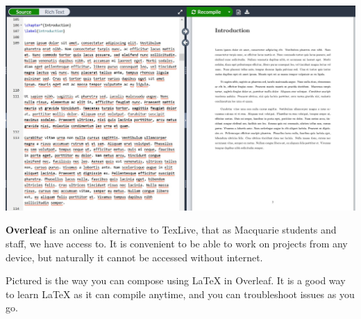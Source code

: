 \documentclass[unknownkeysallowed,usepdftitle=false, aspectratio=169,parskip=full]{beamer}
\newcommand{\secvariable}{nothing}
\newcommand{\mysection}[1]{\renewcommand{\secvariable}{#1}
}
\begin{document}
\mysection{major}
\begin{frame}\label{\secvariable} %
\begin{center}
\includegraphics[width=1\textwidth,height=0.6\textheight,keepaspectratio]{Images/OverleafText.JPG}
\end{center}

    \parbox{\linewidth}{
\textbf{Overleaf} is an online alternative to TexLive, that as Macquarie students and staff, we have access to. 
It is convenient to be able to work on projects from any device, but naturally it cannot be accessed without internet.

Pictured is the way you can compose using LaTeX in Overleaf. It is a good way to learn LaTeX as it can compile anytime, and you can troubleshoot issues as you go. 
}
\end{frame}
\end{document}

